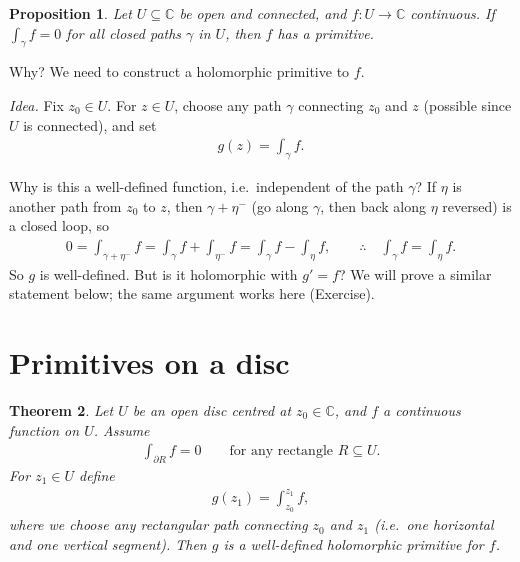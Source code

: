 \documentclass[11pt]{article}
\theoremstyle{plain}
\newtheorem{theorem}{Theorem}[section]
\newtheorem{proposition}[theorem]{Proposition}
\theoremstyle{definition}
\theoremstyle{remark}
\numberwithin{equation}{section}
\newcommand{\be}{\begin{eqnarray}}
\newcommand{\ee}{\end{eqnarray}}
\newcommand{\C}{\mathbb{C}}
\begin{document}
\begin{proposition}
\label{prop:closed-prim}
Let $U\subseteq\C$ be open and connected, and $f\colon U\to\C$ continuous.
If $\int_\gamma f=0$ for all closed paths $\gamma$ in $U$, then $f$ has a
primitive.
\end{proposition}

Why? We need to construct a holomorphic primitive to $f$.

\noindent
\begin{minipage}[c]{0.4\textwidth}
\centering
{}
\end{minipage}\hfill
\begin{minipage}[c]{0.56\textwidth}
\emph{Idea.} Fix $z_0\in U$. For $z\in U$, choose any path $\gamma$
connecting $z_0$ and $z$ (possible since $U$ is connected), and set
\be
 g(z)=\int_\gamma f.
\ee
\end{minipage}

Why is this a well-defined function, i.e.\ independent of the path
$\gamma$? If $\eta$ is another path from $z_0$ to $z$, then $\gamma+\eta^-$
(go along $\gamma$, then back along $\eta$ reversed) is a closed loop, so
\be
 0=\int_{\gamma+\eta^-}f=\int_\gamma f+\int_{\eta^-}f=\int_\gamma f-\int_\eta f,
 \qquad\therefore\quad\int_\gamma f=\int_\eta f.
\ee
So $g$ is well-defined. But is it holomorphic with $g'=f$? We will prove a
similar statement below; the same argument works here (Exercise).

\section{Primitives on a disc}
\begin{theorem}
\label{thm:disc-prim}
Let $U$ be an open disc centred at $z_0\in\C$, and $f$ a continuous function
on $U$. Assume
\be
 \int_{\partial R}f=0\qquad\text{for any rectangle }R\subseteq U.
\ee
For $z_1\in U$ define
\be
 g(z_1)=\int_{z_0}^{z_1}f,
\ee
where we choose any rectangular path connecting $z_0$ and $z_1$ (i.e.\ one
horizontal and one vertical segment). Then $g$ is a well-defined
holomorphic primitive for $f$.
\end{theorem}
\end{document}
